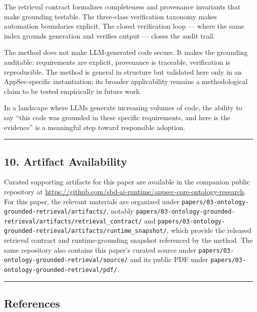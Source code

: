 \documentclass[
]{article}
\begin{document}
The retrieval contract formalizes completeness and provenance invariants
that make grounding testable. The three-class verification taxonomy
makes automation boundaries explicit. The closed verification loop ---
where the same index grounds generation and verifies output --- closes
the audit trail.

The method does not make LLM-generated code secure. It makes the
grounding auditable: requirements are explicit, provenance is traceable,
verification is reproducible. The method is general in structure but
validated here only in an AppSec-specific instantiation; its broader
applicability remains a methodological claim to be tested empirically in
future work.

In a landscape where LLMs generate increasing volumes of code, the
ability to say ``this code was grounded in these specific requirements,
and here is the evidence'' is a meaningful step toward responsible
adoption.

\begin{center}\rule{0.5\linewidth}{0.5pt}\end{center}

\subsection{10. Artifact Availability}\label{artifact-availability}

Curated supporting artifacts for this paper are available in the
companion public repository at
\url{https://github.com/sbd-ai-runtime/appsec-core-ontology-research}.
For this paper, the relevant materials are organized under
\texttt{papers/03-ontology-grounded-retrieval/artifacts/}, notably
\texttt{papers/03-ontology-grounded-retrieval/artifacts/retrieval\_contract/}
and
\texttt{papers/03-ontology-grounded-retrieval/artifacts/runtime\_snapshot/},
which provide the released retrieval contract and runtime-grounding
snapshot referenced by the method. The same repository also contains
this paper's curated source under
\texttt{papers/03-ontology-grounded-retrieval/source/} and its public
PDF under \texttt{papers/03-ontology-grounded-retrieval/pdf/}.

\begin{center}\rule{0.5\linewidth}{0.5pt}\end{center}

\subsection{References}\label{references}
\end{document}
